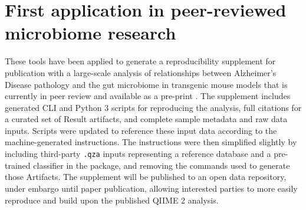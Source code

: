 \section{First application in peer-reviewed microbiome research}

These tools have been applied to generate a reproducibility supplement for
publication with a large-scale analysis of relationships between Alzheimer’s
Disease pathology and the gut microbiome in transgenic mouse models that is
currently in peer review and available as a pre-print \parencite{borsom_predicting_2022}.
The supplement includes generated CLI and Python 3 scripts for reproducing the
analysis, full citations for a curated set of Result artifacts, and complete
sample metadata and raw data inputs. Scripts were updated to reference these
input data according to the machine-generated instructions. The instructions
were then simplified slightly by including third-party \texttt{.qza} inputs representing
a reference database and a pre-trained classifier in the package, and removing
the commands used to generate those Artifacts. The supplement will be published
to an open data repository, under embargo until paper publication, allowing
interested parties to more easily reproduce and build upon the published QIIME 2
analysis.
